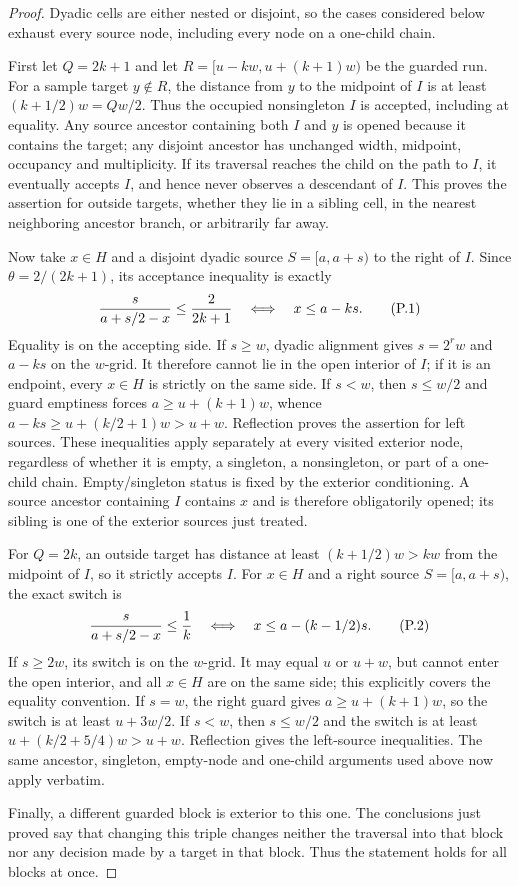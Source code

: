 \documentclass[11pt]{article}
\numberwithin{equation}{section}
\newcommand{\1}{\mathbf 1}\newcommand{\F}{\mathcal F}\newcommand{\D}{\mathcal D}
\begin{document}
\begin{proof}
Dyadic cells are either nested or disjoint, so the cases considered below
exhaust every source node, including every node on a one-child chain.

First let $Q=2k+1$ and let
$R=[u-kw,u+(k+1)w)$ be the guarded run.  For a sample target $y\notin R$,
the distance from $y$ to the midpoint of $I$ is at least
$(k+1/2)w=Qw/2$.  Thus the occupied nonsingleton $I$ is accepted, including
at equality.  Any source ancestor containing both $I$ and $y$ is opened
because it contains the target; any disjoint ancestor has unchanged width,
midpoint, occupancy and multiplicity.  If its traversal reaches the child
on the path to $I$, it eventually accepts $I$, and hence never observes a
descendant of $I$.  This proves the assertion for outside targets, whether
they lie in a sibling cell, in the nearest neighboring ancestor branch, or
arbitrarily far away.

Now take $x\in H$ and a disjoint dyadic source $S=[a,a+s)$ to the right of
$I$.  Since $\theta=2/(2k+1)$, its acceptance inequality is exactly
\[
 {s\over a+s/2-x}\le {2\over2k+1}
 \quad\Longleftrightarrow\quad x\le a-ks.              \tag{P.1}
\]
Equality is on the accepting side.  If $s\ge w$, dyadic alignment gives
$s=2^rw$ and $a-ks$ on the $w$-grid.  It therefore cannot lie in the open
interior of $I$; if it is an endpoint, every $x\in H$ is strictly on the
same side.  If $s<w$, then $s\le w/2$ and guard emptiness forces
$a\ge u+(k+1)w$, whence
$a-ks\ge u+(k/2+1)w>u+w$.  Reflection proves the assertion for left
sources.  These inequalities apply separately at every visited exterior
node, regardless of whether it is empty, a singleton, a nonsingleton, or
part of a one-child chain.  Empty/singleton status is fixed by the exterior
conditioning.  A source ancestor containing $I$ contains $x$ and is
therefore obligatorily opened; its sibling is one of the exterior sources
just treated.

For $Q=2k$, an outside target has distance at least $(k+1/2)w>kw$ from the
midpoint of $I$, so it strictly accepts $I$.  For $x\in H$ and a right
source $S=[a,a+s)$, the exact switch is
\[
 {s\over a+s/2-x}\le {1\over k}
 \quad\Longleftrightarrow\quad x\le a-(k-1/2)s.        \tag{P.2}
\]
If $s\ge2w$, its switch is on the $w$-grid.  It may equal $u$ or $u+w$,
but cannot enter the open interior, and all $x\in H$ are on the same side;
this explicitly covers the equality convention.  If $s=w$, the right guard
gives $a\ge u+(k+1)w$, so the switch is at least $u+3w/2$.  If $s<w$, then
$s\le w/2$ and the switch is at least
$u+(k/2+5/4)w>u+w$.  Reflection gives the left-source inequalities.  The
same ancestor, singleton, empty-node and one-child arguments used above now
apply verbatim.

Finally, a different guarded block is exterior to this one.  The conclusions
just proved say that changing this triple changes neither the traversal into
that block nor any decision made by a target in that block.  Thus the
statement holds for all blocks at once.
\end{proof}
\end{document}
